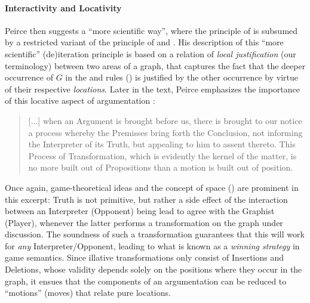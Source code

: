 \paragraph{Interactivity and Locativity}

Peirce then suggests a ``more scientific way'', where the principle of
 is subsumed by a restricted variant of the principle of
 and . His description of this ``more
scientific'' (de)iteration principle is based on a relation of \emph{local
justification} (our terminology) between two areas of a graph, that captures the
fact that the deeper occurrence of $G$ in the  and  rules
() is justified by the other occurrence by virtue of their
respective \emph{locations}. Later in the text, Peirce emphasizes the importance
of this locative aspect of argumentation
\cite[pp.~544--545]{peirce_prolegomena_1906}:

\begin{quote}
  [...] when an Argument is brought before us, there is brought to our notice a
process whereby the Premisses bring forth the Conclusion, not informing the
Interpreter of its Truth, but appealing to him to assent thereto. This Process
of Transformation, which is evidently the kernel of the matter, is no more built
out of Propositions than a motion is built out of position.
\end{quote}

Once again, game-theoretical ideas and the concept of space
() are prominent in this excerpt: Truth is not primitive,
but rather a side effect of the interaction between an Interpreter (Opponent)
being lead to agree with the Graphist (Player), whenever the latter performs a
transformation on the graph under discussion. The soundness of such a
transformation guarantees that this will work for \emph{any}
Interpreter/Opponent, leading to what is known as a \emph{winning strategy} in
game semantics. Since illative transformations only consist of Insertions and
Deletions, whose validity depends solely on the positions where they occur in
the graph, it ensues that the components of an argumentation can be reduced to
``motions'' (moves) that relate pure locations.

